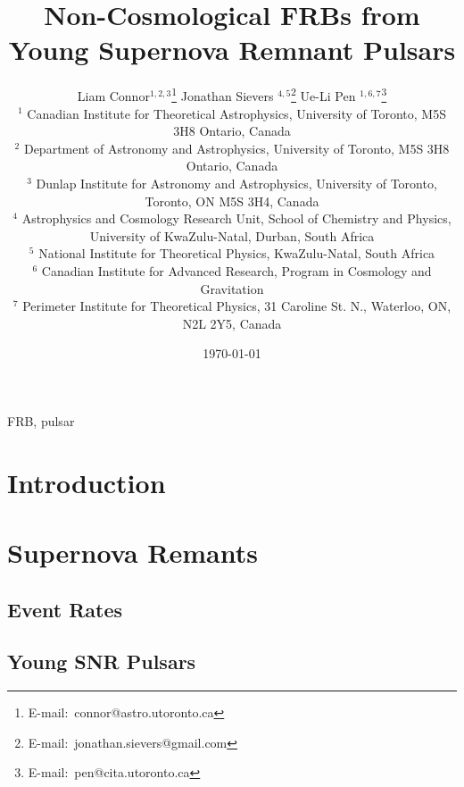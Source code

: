 \documentclass[useAMS,usenatbib]{mn2e}
\title{Non-Cosmological FRBs from Young Supernova Remnant Pulsars}
\author[Connor et al.]{
Liam Connor$^{1,2,3}$\thanks{E-mail:\ connor@astro.utoronto.ca}
Jonathan Sievers $^{4, 5}$\thanks{E-mail:\ jonathan.sievers@gmail.com}
Ue-Li Pen $^{1, 6, 7}$\thanks{E-mail:\ pen@cita.utoronto.ca}
\\
$^1$ Canadian Institute for Theoretical Astrophysics, University of Toronto, M5S 3H8 Ontario, Canada
\\
$^2$ Department of Astronomy and Astrophysics, University of Toronto, 
M5S 3H8 Ontario, Canada
\\
$^3$ Dunlap Institute for Astronomy and Astrophysics, University of Toronto,
Toronto, ON M5S 3H4, Canada
\\
$^4$ Astrophysics and Cosmology Research Unit, School of Chemistry and Physics, University of KwaZulu-Natal, Durban, South Africa
\\
$^5$ National Institute for Theoretical Physics, KwaZulu-Natal, South Africa
\\
$^6$ Canadian Institute for Advanced Research, Program in Cosmology
and Gravitation
\\
$^7$ Perimeter Institute for Theoretical Physics, 31 Caroline St. N., Waterloo, ON, N2L 2Y5, Canada
}
\begin{document}
\date{\today}
\pagerange{\pageref{firstpage}--\pageref{lastpage}} 
\maketitle
\label{firstpage}

\begin{abstract}

\end{abstract}
\begin{keywords}
FRB, pulsar
\end{keywords}


\newcommand{\be}{\begin{eqnarray}}
\newcommand{\ee}{\end{eqnarray}}
\newcommand{\beq}{\begin{equation}}
\newcommand{\eeq}{\end{equation}}

\section{Introduction}


\section{Supernova Remants}


\subsection{Event Rates}
\label{rates}

\subsection{Young SNR Pulsars}
\end{document}
